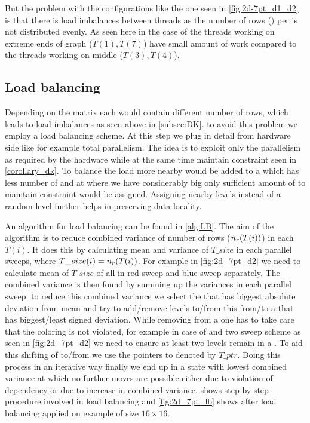   But the problem with the configurations like the one seen in \cref{fig:2d-7pt_d1_d2} is that there is load imbalances between threads as the number of rows (\nrows) per \levelGroup is not distributed evenly. As seen here in the case of \STEX the threads working on extreme ends of graph (\eg $T(1), T(7)$) have small amount of work compared to the threads working on middle (\eg $T(3), T(4)$). 
  
  \subsection{Load balancing}\label{subsec:LB}
  Depending on the matrix each \levelGroup would contain different number of rows, which leads to load imbalances as seen above in \cref{subsec:DK}. \Inorder to avoid this problem we employ a load balancing scheme. At this step  we plug in detail from hardware side like for example total parallelism. The idea is to exploit only the parallelism as required by the hardware while at the same time maintain \DK constraint seen in \cref{corollary_dk}. To balance the load more nearby \levels would be added to a \levelGroup which has less number of \nrows and at \levelGroup where we have considerably big \levels only sufficient amount of \levels to maintain \DK constraint would be assigned. Assigning nearby levels instead of a random level further helps in preserving data locality. 
  
  An algorithm for load balancing can be found in \cref{alg:LB}. The aim of the algorithm is to reduce combined variance of number of rows ($n_{r}(T(i))$) in each \levelGroup $T(i)$. It does this by calculating mean and variance of $T\_size$ in each parallel sweeps, where $T\_size(i)=n_{r}(T(i))$. For example in \cref{fig:2d_7pt_d2} we need to calculate mean of $T\_size$ of all \levelGroups in red sweep and blue sweep separately. The combined variance is then found by summing up the variances in each parallel sweep. \Inorder to reduce this combined variance we select the \levelGroup that has biggest absolute deviation from mean and try to add/remove levels to/from this \levelGroup from/to a \levelGroup that has biggest/least signed deviation. While removing \levels from a \levelGroup one has to take care that the \DK coloring is not violated, for example in case of \DTWO and two sweep scheme as seen in \cref{fig:2d_7pt_d2} we need to ensure at least two levels remain in a \levelGroup. To aid this shifting of \levels to/from \levelGroup we use the pointers to \levelGroup denoted by $T\_ptr$. Doing this process in an iterative way finally we end up in a state with lowest combined variance at which no further moves are possible either due to violation of \DK dependency or due to increase in combined variance.  shows step by step procedure involved in load balancing and \cref{fig:2d_7pt_lb} shows \levelGroups after load balancing applied on \STEX example of size $16 \times 16.$

